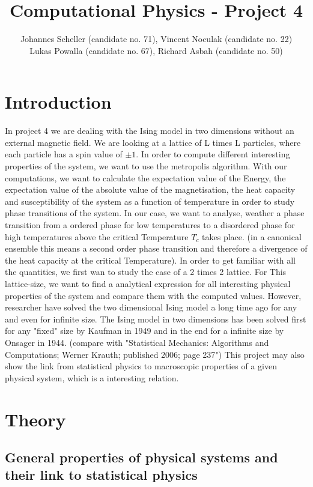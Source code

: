 \documentclass[10pt,a4paper]{article}
\author{Johannes Scheller (candidate no. 71), Vincent Noculak (candidate no. 22)\\ Lukas Powalla (candidate no. 67), Richard Asbah (candidate no. 50) }
\title{Computational Physics - Project 4}
\begin{document}
\maketitle
\newpage
\tableofcontents
\newpage

\section*{Introduction}
In project 4 we are dealing with the Ising model in two dimensions without an external magnetic field. We are looking at a lattice of L times L particles, where each particle has a spin value of $\pm 1$. In order to compute different interesting properties of the system, we want to use the metropolis algorithm.  With our computations, we want to calculate the expectation value of the Energy, the expectation value of the absolute value of the magnetisation, the heat capacity and susceptibility of the system as a function of temperature in order to study phase transitions of the system. 
In our case, we want to analyse, weather a phase transition from a ordered phase for low temperatures to a disordered phase for high temperatures above the critical Temperature $T_c$ takes place. (in a canonical ensemble this means a second order phase transition and therefore a divergence of the heat capacity at the critical Temperature).
In order to get familiar with all the quantities, we first wan to study the case of a 2 times 2 lattice. For This lattice-size, we want to find a analytical expression for all interesting physical properties of the system and compare them with the computed values.
However, researcher have solved the two dimensional Ising model a long time ago for any and even for infinite size.
The Ising model in two dimensions has been solved first for any "fixed" size by Kaufman in 1949 and in the end for a infinite size by Onsager in 1944.  (compare with "Statistical Mechanics: Algorithms and Computations; Werner Krauth; published 2006; page 237")
This project may also show the link from statistical physics to macroscopic properties of a given physical system, which is a interesting relation.

\section{Theory}

\subsection{General properties of physical systems and their link to statistical physics}
\end{document}
